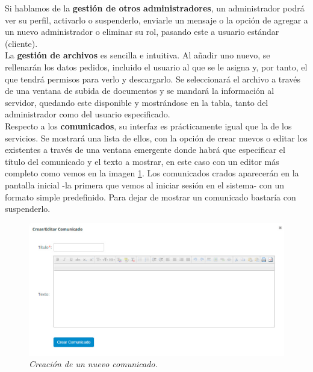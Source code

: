 Si hablamos de la \textbf{gestión de otros administradores}, un administrador podrá ver su perfil, activarlo o suspenderlo, enviarle un mensaje o la opción de agregar a un nuevo administrador o eliminar su rol, pasando este a usuario estándar (cliente). \\

La \textbf{gestión de archivos} es sencilla e intuitiva. Al añadir uno nuevo, se rellenarán los datos pedidos, incluido el usuario al que se le asigna y, por tanto, el que tendrá permisos para verlo y descargarlo. Se seleccionará el archivo a través de una ventana de subida de documentos y se mandará la información al servidor, quedando este disponible y mostrándose en la tabla, tanto del administrador como del usuario especificado. \\

Respecto a los \textbf{comunicados}, su interfaz es prácticamente igual que la de los servicios. Se mostrará una lista de ellos, con la opción de crear nuevos o editar los existentes a través de una ventana emergente donde habrá que especificar el título del comunicado y el texto a mostrar, en este caso con un editor más completo como vemos en la imagen  \ref{fig:nuevo-comunicado}. Los comunicados crados aparecerán en la pantalla inicial -la primera que vemos al iniciar sesión en el sistema- con un formato simple predefinido. Para dejar de mostrar un comunicado bastaría con suspenderlo. \\

\begin{figure}
\centering
  \includegraphics[scale=.40]{img/manual/nuevo-comunicado.jpg}
  \caption{\textit{Creación de un nuevo comunicado.}}
  \label{fig:nuevo-comunicado}
\end{figure}




